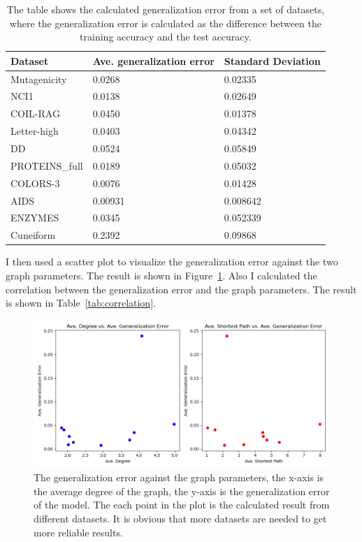 \documentclass{article}
\begin{document}
\begin{table}[h!]
    \centering
    \begin{tabular}{@{}lll@{}}
    \toprule
    Dataset        & Ave. generalization error & Standard Deviation   \\ \midrule
    Mutagenicity   & 0.0268      & 0.02335 \\
    NCI1           & 0.0138      & 0.02649 \\
    COIL-RAG       & 0.0450      & 0.01378 \\
    Letter-high    & 0.0403      & 0.04342 \\
    DD             & 0.0524      & 0.05849 \\
    PROTEINS\_full & 0.0189      & 0.05032 \\
    COLORS-3       & 0.0076      & 0.01428 \\
    AIDS           &  0.00931    & 0.008642 \\
    ENZYMES           &  0.0345    & 0.052339 \\
    Cuneiform           &  0.2392    & 0.09868 \\ \bottomrule
    \end{tabular}
    \caption{The table shows the calculated generalization error from a set of datasets, where the generalization error is calculated as the difference between the training accuracy and the test accuracy.}
    \label{tab:error}
\end{table}



I then used a scatter plot to visualize the generalization error against the two graph parameters. The result is shown in Figure~\ref{fig:scatter}. Also I calculated the correlation between the generalization error and the graph parameters. The result is shown in Table~\ref{tab:correlation}.

\begin{figure}[h!]
    \includegraphics[width=\textwidth]{final_results.png}
    \caption{The generalization error against the graph parameters, the x-axis is the average degree of the graph, the y-axis is the generalization error of the model. The each point in the plot is the calculated result from different datasets. It is obvious that more datasets are needed to get more reliable results.}
    \label{fig:scatter}
\end{figure}
\end{document}
